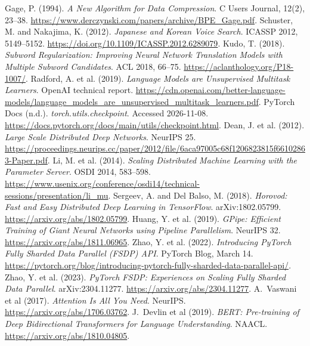 Gage, P. (1994). \emph{A New Algorithm for Data Compression}. C Users Journal, 12(2), 23--38. \url{https://www.derczynski.com/papers/archive/BPE_Gage.pdf}.
 Schuster, M. and Nakajima, K. (2012). \emph{Japanese and Korean Voice Search}. ICASSP 2012, 5149--5152. \url{https://doi.org/10.1109/ICASSP.2012.6289079}.
 Kudo, T. (2018). \emph{Subword Regularization: Improving Neural Network Translation Models with Multiple Subword Candidates}. ACL 2018, 66--75. \url{https://aclanthology.org/P18-1007/}.
 Radford, A. et al. (2019). \emph{Language Models are Unsupervised Multitask Learners}. OpenAI technical report. \url{https://cdn.openai.com/better-language-models/language_models_are_unsupervised_multitask_learners.pdf}.
 PyTorch Docs (n.d.). \emph{torch.utils.checkpoint}. Accessed 2026-11-08. \url{https://docs.pytorch.org/docs/main/utils/checkpoint.html}.
 Dean, J. et al. (2012). \emph{Large Scale Distributed Deep Networks}. NeurIPS 25. \url{https://proceedings.neurips.cc/paper/2012/file/6aca97005c68f1206823815f66102863-Paper.pdf}.
 Li, M. et al. (2014). \emph{Scaling Distributed Machine Learning with the Parameter Server}. OSDI 2014, 583--598. \url{https://www.usenix.org/conference/osdi14/technical-sessions/presentation/li_mu}.
 Sergeev, A. and Del Balso, M. (2018). \emph{Horovod: Fast and Easy Distributed Deep Learning in TensorFlow}. arXiv:1802.05799. \url{https://arxiv.org/abs/1802.05799}.
 Huang, Y. et al. (2019). \emph{GPipe: Efficient Training of Giant Neural Networks using Pipeline Parallelism}. NeurIPS 32. \url{https://arxiv.org/abs/1811.06965}.
 Zhao, Y. et al. (2022). \emph{Introducing PyTorch Fully Sharded Data Parallel (FSDP) API}. PyTorch Blog, March 14. \url{https://pytorch.org/blog/introducing-pytorch-fully-sharded-data-parallel-api/}.
 Zhao, Y. et al. (2023). \emph{PyTorch FSDP: Experiences on Scaling Fully Sharded Data Parallel}. arXiv:2304.11277. \url{https://arxiv.org/abs/2304.11277}.
 A.~Vaswani et al (2017). \emph{Attention Is All You Need}. NeurIPS. \url{https://arxiv.org/abs/1706.03762}.
 J.~Devlin et al (2019). \emph{BERT: Pre-training of Deep Bidirectional Transformers for Language Understanding}. NAACL. \url{https://arxiv.org/abs/1810.04805}.
